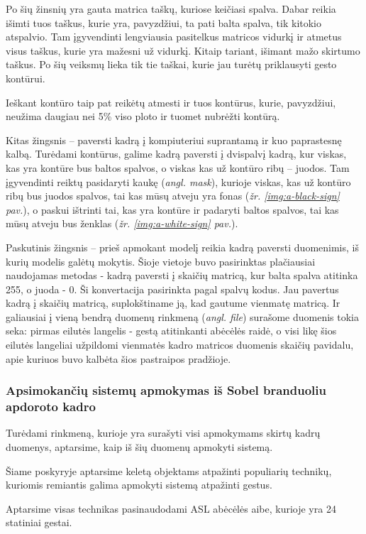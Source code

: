 \documentclass{VUMIFInfKursinis}
\begin{document}
Po šių žinsnių yra gauta matrica taškų, kuriose keičiasi spalva. Dabar reikia išimti tuos taškus, kurie yra, pavyzdžiui, ta pati balta spalva, tik kitokio atspalvio. Tam įgyvendinti lengviausia pasitelkus matricos vidurkį ir atmetus visus taškus, kurie yra mažesni už vidurkį. Kitaip tariant, išimant mažo skirtumo taškus. Po šių veiksmų lieka tik tie taškai, kurie jau turėtų priklausyti gesto kontūrui.

Ieškant kontūro taip pat reikėtų atmesti ir tuos kontūrus, kurie, pavyzdžiui, neužima daugiau nei 5\% viso ploto ir tuomet nubrėžti kontūrą.

Kitas žingsnis – paversti kadrą į kompiuteriui suprantamą ir kuo paprastesnę kalbą. Turėdami kontūrus, galime kadrą paversti į dvispalvį kadrą, kur viskas, kas yra kontūre bus baltos spalvos, o viskas kas už kontūro ribų – juodos. Tam įgyvendinti reiktų pasidaryti kaukę (\textit{angl. mask}), kurioje viskas, kas už kontūro ribų bus juodos spalvos, tai kas mūsų atveju yra fonas (\textit{žr. \ref{img:a-black-sign} pav.}), o paskui ištrinti tai, kas yra kontūre ir padaryti baltos spalvos, tai kas mūsų atveju bus ženklas (\textit{žr. \ref{img:a-white-sign} pav.}).

Paskutinis žingsnis – prieš apmokant modelį reikia kadrą paversti duomenimis, iš kurių modelis galėtų mokytis. Šioje vietoje buvo pasirinktas plačiausiai naudojamas metodas - kadrą paversti į skaičių matricą, kur balta spalva atitinka 255, o juoda - 0. Ši konvertacija pasirinkta pagal spalvų kodus. Jau pavertus kadrą į skaičių matricą, suplokštiname ją, kad gautume vienmatę matricą. Ir galiausiai į vieną bendrą duomenų rinkmeną (\textit{angl. file}) surašome duomenis tokia seka: pirmas eilutės langelis - gestą atitinkanti abėcėlės raidė, o visi likę šios eilutės langeliai užpildomi vienmatės kadro matricos duomenis skaičių pavidalu, apie kuriuos buvo kalbėta šios pastraipos pradžioje.

\subsubsection{Apsimokančių sistemų apmokymas iš Sobel branduoliu apdoroto kadro}
Turėdami rinkmeną, kurioje yra surašyti visi apmokymams skirtų kadrų duomenys, aptarsime, kaip iš šių duomenų apmokyti sistemą.

Šiame poskyryje aptarsime keletą objektams atpažinti populiarių technikų, kuriomis remiantis galima apmokyti sistemą atpažinti gestus.

Aptarsime visas technikas pasinaudodami ASL abėcėlės aibe, kurioje yra 24 statiniai gestai.
\end{document}
